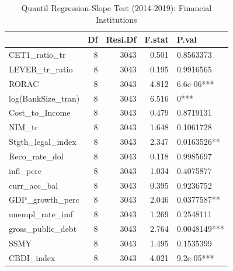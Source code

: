 \begin{table}[ht]
\centering
\caption{Quantil Regression-Slope Test (2014-2019): Financial Institutions} 
\begingroup\small
\begin{tabular}{lrrrl}
  \toprule
 & Df & Resi.Df & F.stat & P.val \\ 
  \midrule
CET1\_ratio\_tr & 8 & 3043 & 0.501 & 0.8563373 \\ 
  LEVER\_tr\_ratio & 8 & 3043 & 0.195 & 0.9916565 \\ 
  RORAC & 8 & 3043 & 4.812 & 6.6e-06*** \\ 
  log(BankSize\_tran) & 8 & 3043 & 6.516 & 0*** \\ 
  Cost\_to\_Income & 8 & 3043 & 0.479 & 0.8719131 \\ 
  NIM\_tr & 8 & 3043 & 1.648 & 0.1061728 \\ 
  Stgth\_legal\_index & 8 & 3043 & 2.347 & 0.0163526** \\ 
  Reco\_rate\_dol & 8 & 3043 & 0.118 & 0.9985697 \\ 
  infl\_perc & 8 & 3043 & 1.034 & 0.4075877 \\ 
  curr\_acc\_bal & 8 & 3043 & 0.395 & 0.9236752 \\ 
  GDP\_growth\_perc & 8 & 3043 & 2.046 & 0.0377587** \\ 
  unempl\_rate\_imf & 8 & 3043 & 1.269 & 0.2548111 \\ 
  gross\_public\_debt & 8 & 3043 & 2.764 & 0.0048149*** \\ 
  SSMY & 8 & 3043 & 1.495 & 0.1535399 \\ 
  CBDI\_index & 8 & 3043 & 4.021 & 9.2e-05*** \\ 
   \bottomrule
\end{tabular}
\endgroup
\end{table}
